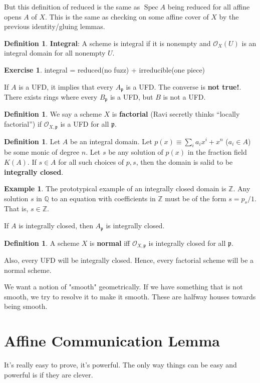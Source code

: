 \documentclass{book}
\newcommand{\Z}{\ensuremath{\mathbb{Z}}}
\newcommand{\Q}{\ensuremath{\mathbb{Q}}}
\renewcommand{\O}{\ensuremath{\mathcal{O}}}
\newcommand{\Spec}{\operatorname{Spec}}
\newcommand{\p}{\mathfrak{p}}
\theoremstyle{definition}
\newtheorem{example}[theorem]{Example}
\newtheorem{definition}[theorem]{Definition}
\newtheorem{exercise}[theorem]{Exercise}
\begin{document}
But this definition of reduced is the same as $\Spec A$ being reduced for all
affine opens $A$ of $X$. This is the same as checking on some affine cover
of $X$ by the previous identity/gluing lemmas.

\begin{definition}
\textbf{Integral}: A scheme is integral if it is nonempty and $\O_X(U)$ is 
an integral domain for all nonempty $U$.
\end{definition}

\begin{exercise}
integral = reduced(no fuzz) + irreducible(one piece)
\end{exercise}

If $A$ is a UFD, it implies that every $A_\p$ is a UFD.  The converse is \textbf{not true!}.
There exists rings where every $B_\p$ is a UFD, but $B$ is not a UFD.
\begin{definition}
We say a scheme $X$ is \textbf{factorial} (Ravi secretly thinks ``locally factorial'')
if $\O_{X, \p}$ is a UFD for all $\p$.
\end{definition}

\begin{definition}
Let $A$ be an integral domain. Let $p(x) \equiv \sum_i a_i x^i + x^n$ ($a_i \in A$) be
some monic of degree $n$. Let $s$ be any solution of $p(x)$ in the fraction field $K(A)$.
If $s \in A$ for all such choices of $p, s$, then the domain is salid to be
\textbf{integrally closed}.
\end{definition}
\begin{example}
The prototypical example of an integrally closed domain is $\Z$. Any solution $s$ in $\Q$
to an equation with coefficients in $\Z$ must be of the form $s = p_s/1$. That is,
$s \in \Z$. 
\end{example}

If $A$ is integrally closed, then $A_\p$ is integrally closed.
\begin{definition}
A scheme $X$ is \textbf{normal} iff $\O_{X, \p}$ is integrally closed for all $\p$.
\end{definition}

Also, every UFD will be integrally closed. Hence, every factorial scheme
will be a normal scheme. 

We want a notion of "smooth" geometrically. If we have something that is not
smooth, we try to resolve it to make it smooth. These are halfway houses
towards being smooth.

\section{Affine Communication Lemma}
It's really easy to prove, it's powerful. The only way things can be easy
and powerful is if they are clever.
\end{document}
